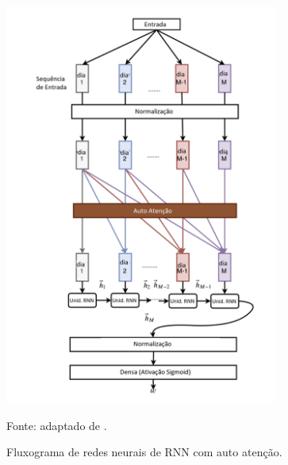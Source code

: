         \begin{figure}[H]
            \centering
            \caption{Fluxograma de redes neurais de RNN com auto atenção.}
            \label{fig:RNN_SelfAtt}
            \includegraphics[width=0.8\textwidth]{./imagens/RNN_SelfAtt.png}
            \par \footnotesize Fonte: adaptado de .
        \end{figure}

